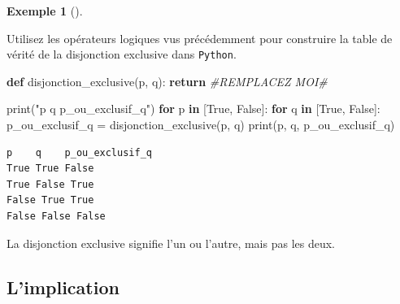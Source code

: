 \documentclass[
  letterpaper,
]{scrbook}
\newenvironment{Shaded}{\begin{snugshade}}{\end{snugshade}}
\newcommand{\BuiltInTok}[1]{\textcolor[rgb]{0.00,0.50,0.00}{#1}}
\newcommand{\CommentTok}[1]{\textcolor[rgb]{0.38,0.63,0.69}{\textit{#1}}}
\newcommand{\ControlFlowTok}[1]{\textcolor[rgb]{0.00,0.44,0.13}{\textbf{#1}}}
\newcommand{\KeywordTok}[1]{\textcolor[rgb]{0.00,0.44,0.13}{\textbf{#1}}}
\newcommand{\NormalTok}[1]{\textcolor[rgb]{0.00,0.44,0.13}{#1}}
\newcommand{\OperatorTok}[1]{\textcolor[rgb]{0.40,0.40,0.40}{#1}}
\newcommand{\StringTok}[1]{\textcolor[rgb]{0.25,0.44,0.63}{#1}}
\newcommand{\VariableTok}[1]{\textcolor[rgb]{0.10,0.09,0.49}{#1}}
\theoremstyle{plain}
\theoremstyle{definition}
\theoremstyle{definition}
\newtheorem{example}{Exemple}[chapter]
\theoremstyle{remark}
\begin{document}
\begin{example}[]\protect\hypertarget{exm-disjonction-exclusive-python}{}\label{exm-disjonction-exclusive-python}

Utilisez les opérateurs logiques vus précédemment pour construire la
table de vérité de la disjonction exclusive dans \texttt{Python}.

\hypertarget{disjonction-exclusive-python-todo}{}
\begin{Shaded}
\begin{Highlighting}[]
\KeywordTok{def}\NormalTok{ disjonction\_exclusive(p, q):}
    \ControlFlowTok{return} \CommentTok{\#REMPLACEZ MOI\#}

\BuiltInTok{print}\NormalTok{(}\StringTok{"p    q    p\_ou\_exclusif\_q"}\NormalTok{)}
\ControlFlowTok{for}\NormalTok{ p }\KeywordTok{in}\NormalTok{ [}\VariableTok{True}\NormalTok{, }\VariableTok{False}\NormalTok{]:}
    \ControlFlowTok{for}\NormalTok{ q }\KeywordTok{in}\NormalTok{ [}\VariableTok{True}\NormalTok{, }\VariableTok{False}\NormalTok{]:}
\NormalTok{        p\_ou\_exclusif\_q }\OperatorTok{=}\NormalTok{ disjonction\_exclusive(p, q)}
        \BuiltInTok{print}\NormalTok{(p, q, p\_ou\_exclusif\_q)}
\end{Highlighting}
\end{Shaded}

\hypertarget{disjonction-exclusive-python}{}
\begin{verbatim}
p    q    p_ou_exclusif_q
True True False
True False True
False True True
False False False
\end{verbatim}

\end{example}

\begin{tcolorbox}[enhanced jigsaw, colbacktitle=quarto-callout-important-color!10!white, toptitle=1mm, left=2mm, toprule=.15mm, opacityback=0, bottomrule=.15mm, breakable, coltitle=black, title=\textcolor{quarto-callout-important-color}{\faExclamation}\hspace{0.5em}{Important}, colframe=quarto-callout-important-color-frame, arc=.35mm, titlerule=0mm, rightrule=.15mm, opacitybacktitle=0.6, leftrule=.75mm, bottomtitle=1mm, colback=white]

La disjonction exclusive signifie l'un ou l'autre, mais pas les deux.

\end{tcolorbox}

\hypertarget{limplication}{%
\subsection{L'implication}\label{limplication}}
\end{document}
